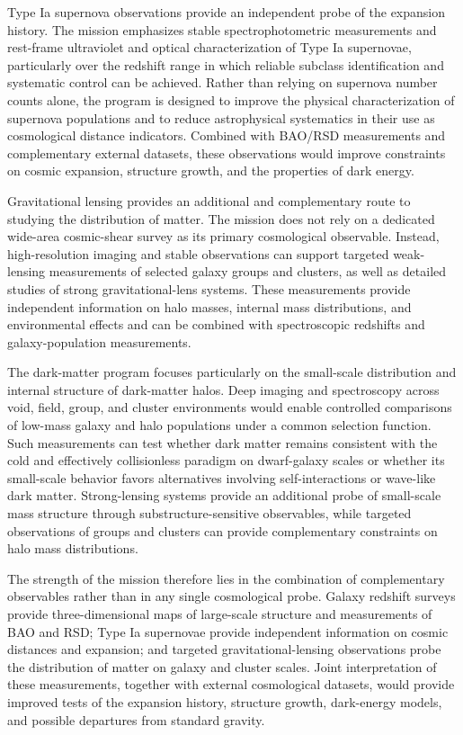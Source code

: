 Type Ia supernova observations provide an independent probe of the expansion history. The mission emphasizes stable spectrophotometric measurements and rest-frame ultraviolet and optical characterization of Type Ia supernovae, particularly over the redshift range in which reliable subclass identification and systematic control can be achieved. Rather than relying on supernova number counts alone, the program is designed to improve the physical characterization of supernova populations and to reduce astrophysical systematics in their use as cosmological distance indicators. Combined with BAO/RSD measurements and complementary external datasets, these observations would improve constraints on cosmic expansion, structure growth, and the properties of dark energy.

Gravitational lensing provides an additional and complementary route to studying the distribution of matter. The mission does not rely on a dedicated wide-area cosmic-shear survey as its primary cosmological observable. Instead, high-resolution imaging and stable observations can support targeted weak-lensing measurements of selected galaxy groups and clusters, as well as detailed studies of strong gravitational-lens systems. These measurements provide independent information on halo masses, internal mass distributions, and environmental effects and can be combined with spectroscopic redshifts and galaxy-population measurements.

The dark-matter program focuses particularly on the small-scale distribution and internal structure of dark-matter halos. Deep imaging and spectroscopy across void, field, group, and cluster environments would enable controlled comparisons of low-mass galaxy and halo populations under a common selection function. Such measurements can test whether dark matter remains consistent with the cold and effectively collisionless paradigm on dwarf-galaxy scales or whether its small-scale behavior favors alternatives involving self-interactions or wave-like dark matter. Strong-lensing systems provide an additional probe of small-scale mass structure through substructure-sensitive observables, while targeted observations of groups and clusters can provide complementary constraints on halo mass distributions.

The strength of the mission therefore lies in the combination of complementary observables rather than in any single cosmological probe. Galaxy redshift surveys provide three-dimensional maps of large-scale structure and measurements of BAO and RSD; Type Ia supernovae provide independent information on cosmic distances and expansion; and targeted gravitational-lensing observations probe the distribution of matter on galaxy and cluster scales. Joint interpretation of these measurements, together with external cosmological datasets, would provide improved tests of the expansion history, structure growth, dark-energy models, and possible departures from standard gravity.


